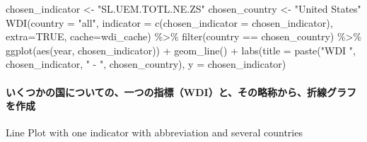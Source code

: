 \documentclass[
]{bxjsbook}
\newenvironment{Shaded}{\begin{snugshade}}{\end{snugshade}}
\newcommand{\AttributeTok}[1]{\textcolor[rgb]{0.77,0.63,0.00}{#1}}
\newcommand{\ConstantTok}[1]{\textcolor[rgb]{0.00,0.00,0.00}{#1}}
\newcommand{\FunctionTok}[1]{\textcolor[rgb]{0.00,0.00,0.00}{#1}}
\newcommand{\NormalTok}[1]{#1}
\newcommand{\OtherTok}[1]{\textcolor[rgb]{0.56,0.35,0.01}{#1}}
\newcommand{\SpecialCharTok}[1]{\textcolor[rgb]{0.00,0.00,0.00}{#1}}
\newcommand{\StringTok}[1]{\textcolor[rgb]{0.31,0.60,0.02}{#1}}
\theoremstyle{definition}
\theoremstyle{definition}
\theoremstyle{definition}
\theoremstyle{definition}
\theoremstyle{remark}
\begin{document}
\begin{Shaded}
\begin{Highlighting}[]
\NormalTok{chosen\_indicator }\OtherTok{\textless{}{-}} \StringTok{"SL.UEM.TOTL.NE.ZS"}
\NormalTok{chosen\_country }\OtherTok{\textless{}{-}} \StringTok{"United States"}
\FunctionTok{WDI}\NormalTok{(}\AttributeTok{country =} \StringTok{"all"}\NormalTok{, }\AttributeTok{indicator =} \FunctionTok{c}\NormalTok{(}\AttributeTok{chosen\_indicator =}\NormalTok{ chosen\_indicator), }
    \AttributeTok{extra=}\ConstantTok{TRUE}\NormalTok{, }\AttributeTok{cache=}\NormalTok{wdi\_cache) }\SpecialCharTok{\%\textgreater{}\%}
  \FunctionTok{filter}\NormalTok{(country }\SpecialCharTok{==}\NormalTok{ chosen\_country) }\SpecialCharTok{\%\textgreater{}\%} 
  \FunctionTok{ggplot}\NormalTok{(}\FunctionTok{aes}\NormalTok{(year, chosen\_indicator)) }\SpecialCharTok{+} \FunctionTok{geom\_line}\NormalTok{() }\SpecialCharTok{+}
  \FunctionTok{labs}\NormalTok{(}\AttributeTok{title =} \FunctionTok{paste}\NormalTok{(}\StringTok{"WDI "}\NormalTok{, chosen\_indicator, }\StringTok{" {-} "}\NormalTok{, chosen\_country), }
       \AttributeTok{y =}\NormalTok{ chosen\_indicator)}
\end{Highlighting}
\end{Shaded}

\hypertarget{ux3044ux304fux3064ux304bux306eux56fdux306bux3064ux3044ux3066ux306eux4e00ux3064ux306eux6307ux6a19wdiux3068ux305dux306eux7565ux79f0ux304bux3089ux6298ux7ddaux30b0ux30e9ux30d5ux3092ux4f5cux6210}{%
\paragraph{いくつかの国についての、一つの指標（WDI）と、その略称から、折線グラフを作成}\label{ux3044ux304fux3064ux304bux306eux56fdux306bux3064ux3044ux3066ux306eux4e00ux3064ux306eux6307ux6a19wdiux3068ux305dux306eux7565ux79f0ux304bux3089ux6298ux7ddaux30b0ux30e9ux30d5ux3092ux4f5cux6210}}

Line Plot with one indicator with abbreviation and several countries
\end{document}
